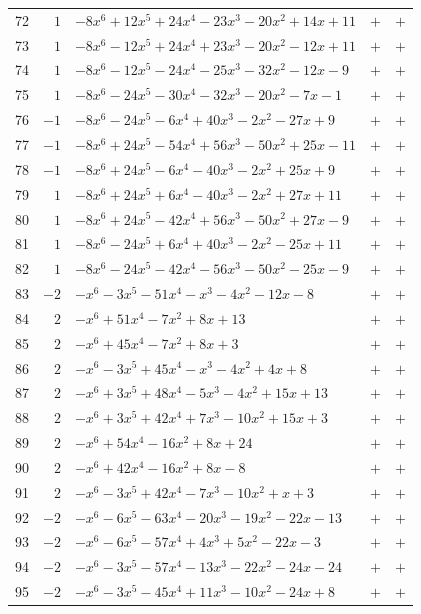 \documentclass[11pt]{article}
\begin{document}
\begin{longtable}{@{}rrlcc@{}}
72 & $1$ & $-8x^{6}+12x^{5}+24x^{4}-23x^{3}-20x^{2}+14x+11$ & $+$ & $+$\\
73 & $1$ & $-8x^{6}-12x^{5}+24x^{4}+23x^{3}-20x^{2}-12x+11$ & $+$ & $+$\\
74 & $1$ & $-8x^{6}-12x^{5}-24x^{4}-25x^{3}-32x^{2}-12x-9$ & $+$ & $+$\\
75 & $1$ & $-8x^{6}-24x^{5}-30x^{4}-32x^{3}-20x^{2}-7x-1$ & $+$ & $+$\\
76 & $-1$ & $-8x^{6}-24x^{5}-6x^{4}+40x^{3}-2x^{2}-27x+9$ & $+$ & $+$\\
77 & $-1$ & $-8x^{6}+24x^{5}-54x^{4}+56x^{3}-50x^{2}+25x-11$ & $+$ & $+$\\
78 & $-1$ & $-8x^{6}+24x^{5}-6x^{4}-40x^{3}-2x^{2}+25x+9$ & $+$ & $+$\\
79 & $1$ & $-8x^{6}+24x^{5}+6x^{4}-40x^{3}-2x^{2}+27x+11$ & $+$ & $+$\\
80 & $1$ & $-8x^{6}+24x^{5}-42x^{4}+56x^{3}-50x^{2}+27x-9$ & $+$ & $+$\\
81 & $1$ & $-8x^{6}-24x^{5}+6x^{4}+40x^{3}-2x^{2}-25x+11$ & $+$ & $+$\\
82 & $1$ & $-8x^{6}-24x^{5}-42x^{4}-56x^{3}-50x^{2}-25x-9$ & $+$ & $+$\\
83 & $-2$ & $-x^{6}-3x^{5}-51x^{4}-x^{3}-4x^{2}-12x-8$ & $+$ & $+$\\
84 & $2$ & $-x^{6}+51x^{4}-7x^{2}+8x+13$ & $+$ & $+$\\
85 & $2$ & $-x^{6}+45x^{4}-7x^{2}+8x+3$ & $+$ & $+$\\
86 & $2$ & $-x^{6}-3x^{5}+45x^{4}-x^{3}-4x^{2}+4x+8$ & $+$ & $+$\\
87 & $2$ & $-x^{6}+3x^{5}+48x^{4}-5x^{3}-4x^{2}+15x+13$ & $+$ & $+$\\
88 & $2$ & $-x^{6}+3x^{5}+42x^{4}+7x^{3}-10x^{2}+15x+3$ & $+$ & $+$\\
89 & $2$ & $-x^{6}+54x^{4}-16x^{2}+8x+24$ & $+$ & $+$\\
90 & $2$ & $-x^{6}+42x^{4}-16x^{2}+8x-8$ & $+$ & $+$\\
91 & $2$ & $-x^{6}-3x^{5}+42x^{4}-7x^{3}-10x^{2}+x+3$ & $+$ & $+$\\
92 & $-2$ & $-x^{6}-6x^{5}-63x^{4}-20x^{3}-19x^{2}-22x-13$ & $+$ & $+$\\
93 & $-2$ & $-x^{6}-6x^{5}-57x^{4}+4x^{3}+5x^{2}-22x-3$ & $+$ & $+$\\
94 & $-2$ & $-x^{6}-3x^{5}-57x^{4}-13x^{3}-22x^{2}-24x-24$ & $+$ & $+$\\
95 & $-2$ & $-x^{6}-3x^{5}-45x^{4}+11x^{3}-10x^{2}-24x+8$ & $+$ & $+$\\

\end{longtable}
\end{document}
